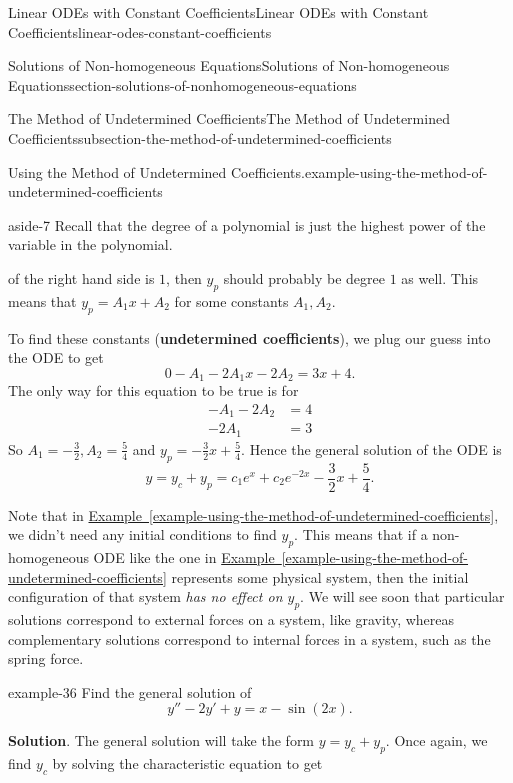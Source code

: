 \documentclass[oneside,10pt,]{book}
\newcommand{\terminology}[1]{\textbf{#1}}
\numberwithin{equation}{section}
\newcommand{\amp}{&}
\begin{document}
\begin{chapterptx}{Linear ODEs with Constant Coefficients}{}{Linear ODEs with Constant Coefficients}{}{}{linear-odes-constant-coefficients}
\begin{sectionptx}{Solutions of Non-homogeneous Equations}{}{Solutions of Non-homogeneous Equations}{}{}{section-solutions-of-nonhomogeneous-equations}
\begin{subsectionptx}{The Method of Undetermined Coefficients}{}{The Method of Undetermined Coefficients}{}{}{subsection-the-method-of-undetermined-coefficients}
\begin{example}{Using the Method of Undetermined Coefficients.}{example-using-the-method-of-undetermined-coefficients}
\begin{aside}{}{aside-7}
\hypertarget{p-231}{}%
Recall that the degree of a polynomial is just the highest power of the variable in the polynomial.%
\end{aside}
 of the right hand side is \(1\), then \(y_{p}\) should probably be degree \(1\) as well. This means that \(y_{p} = A_{1}x + A_{2}\) for some constants \(A_{1},A_{2}\).%
\par
\hypertarget{p-232}{}%
To find these constants (\terminology{undetermined coefficients}), we plug our guess into the ODE to get%
\begin{equation*}
0 - A_{1} - 2A_{1}x - 2A_{2} = 3x + 4.
\end{equation*}
The only way for this equation to be true is for%
\begin{align*}
-A_{1} - 2A_{2} \amp = 4 \\
-2A_{1} \amp = 3
\end{align*}
So \(A_{1} = -\frac{3}{2}, A_{2} = \frac{5}{4}\) and \(y_{p} = -\frac{3}{2}x + \frac{5}{4}\). Hence the general solution of the ODE is%
\begin{equation*}
y = y_{c} + y_{p} = c_{1}e^{x} + c_{2}e^{-2x} - \frac{3}{2}x + \frac{5}{4}.
\end{equation*}
%
\end{example}
\hypertarget{p-233}{}%
Note that in \hyperref[example-using-the-method-of-undetermined-coefficients]{Example~\ref{example-using-the-method-of-undetermined-coefficients}}, we didn't need any initial conditions to find \(y_{p}\). This means that if a non-homogeneous ODE like the one in \hyperref[example-using-the-method-of-undetermined-coefficients]{Example~\ref{example-using-the-method-of-undetermined-coefficients}} represents some physical system, then the initial configuration of that system \emph{has no effect on \(y_{p}\)}. We will see soon that particular solutions correspond to external forces on a system, like gravity, whereas complementary solutions correspond to internal forces in a system, such as the spring force.%
\begin{example}{}{example-36}%
\hypertarget{p-234}{}%
Find the general solution of%
\begin{equation*}
y'' - 2y' + y = x - \sin(2x).
\end{equation*}
%
\par\smallskip%
\noindent\textbf{Solution}.\hypertarget{solution-33}{}\quad%
\hypertarget{p-235}{}%
The general solution will take the form \(y = y_{c} + y_{p}\). Once again, we find \(y_{c}\) by solving the characteristic equation to get%
\begin{equation*}

\end{equation*}
\end{example}
\end{subsectionptx}
\end{sectionptx}
\end{chapterptx}
\end{document}
